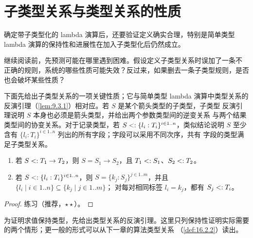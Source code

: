 \section{子类型关系与类型关系的性质}
\label{sec:15.3}

确定带子类型化的 lambda 演算后，还要验证定义确实合理，特别是简单类型
lambda 演算的保持性和进展性在加入子类型化后仍然成立。

\begin{exercise}
\label{ex:15.3.1}
继续阅读前，先预测可能在哪里遇到困难。假设定义子类型关系时误加了一条不
正确的规则，系统的哪些性质可能失效？反过来，如果删去一条子类型规则，是否
也会破坏某些性质？
\end{exercise}

下面先给出子类型关系的一项关键性质；它与简单类型 lambda 演算中类型关系的
反演引理（\cref{lem:9.3.1}）相对应。若 \(S\) 是某个箭头类型的子类型，子类型
反演引理说明 \(S\) 本身也必须是箭头类型，并给出两个参数类型间的逆变关系
与两个结果类型间的协变关系。对于记录类型，若
\(S\mathrel{<:}\{l_i:T_i\}^{i\in1..n}\)，类似结论说明 \(S\) 至少含有
\(\{l_i:T_i\}^{i\in1..n}\) 列出的所有字段；字段可以采用不同次序，共有
字段的类型满足子类型关系。

\taplstatementliststart
\begin{lemma}[子类型关系的反演]
\label{lem:15.3.2}
\taplstatementlistbreak
\begin{enumerate}
\item 若 \(S\mathrel{<:} T_1\to T_2\)，则
  \(S=S_1\to S_2\)，且 \(T_1\mathrel{<:} S_1\)、\(S_2\mathrel{<:} T_2\)。
\item 若 \(S\mathrel{<:}\{l_i:T_i\}^{i\in1..n}\)，则
  \(S=\{k_j:S_j\}^{j\in1..m}\)，并且
  \(\{l_i\mid i\in1..n\}\subseteq\{k_j\mid j\in1..m\}\)；
  对每对相同标签 \(l_i=k_j\)，都有 \(S_j\mathrel{<:} T_i\)。
\end{enumerate}
\end{lemma}
\begin{proof}
练习（推荐，\(\star\star\)）。
\end{proof}


为证明求值保持类型，先给出类型关系的反演引理。这里只列保持性证明实际需要
的两个情形；更一般的形式可以从下一章的算法类型关系
（\cref{def:16.2.2}）读出。

